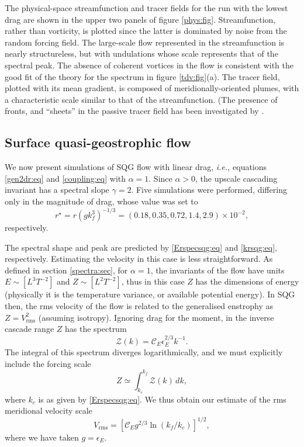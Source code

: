 \documentclass{jfm}
\newcommand{\ie}  {\textit{i.e., }}
\newcommand{\ca}  [1]{\mathcal{#1}}
\newcommand{\rms} {\mathrm{rms}}
\begin{document}
The physical-space streamfunction and tracer fields for the run with
the lowest drag are shown in the upper two panels of figure
\ref{phys:fig}. Streamfunction, rather than vorticity, is plotted
since the latter is dominated by noise from the random forcing field.
The large-scale flow represented in the streamfunction is nearly
structureless, but with undulations whose scale represents that of the
spectral peak. The absence of coherent vortices in the flow is
consistent with the good fit of the theory for the spectrum in figure
\ref{tdv:fig}(a).  The tracer field, plotted with its mean gradient,
is composed of meridionally-oriented plumes, with a characteristic
scale similar to that of the streamfunction.  (The presence of fronts,
and ``sheets'' in the passive tracer field has been investigated by
\citet{constantin94}. %

\subsection{Surface quasi-geostrophic flow}
\label{sqg_exp:ssc}

We now present simulations of SQG flow with linear drag, \ie equations
\eqref{gen2dr:eq} and \eqref{coupling:eq} with $\alpha=1$.  Since
$\alpha>0$, the upscale cascading invariant has a spectral slope
$\gamma=2$.  Five simulations were performed, differing only in the
magnitude of drag, whose value was set to
\[
r^{\star} = r\left(gk_f^3\right)^{-1/3}
=(0.18,0.35,0.72,1.4,2.9)\times 10^{-2},
\]
respectively.

The spectral shape and peak are predicted by \eqref{Erspecsqg:eq} and
\eqref{krsqg:eq}, respectively.  Estimating the velocity in this case
is less straightforward.  As defined in section \ref{spectra:sec}, for
$\alpha=1$, the invariants of the flow have units $E\sim[L^3T^{-2}]$
and $Z\sim[L^2T^{-2}]$, thus in this case $Z$ has the dimensions of
energy (physically it is the temperature variance, or available
potential energy).  In SQG then, the rms velocity of the flow is
related to the generalised enstrophy as $Z=V_{\rms}^2$ (assuming
isotropy).  Ignoring drag for the moment, in the inverse cascade range
$Z$ has the spectrum
\begin{equation}
\ca{Z}(k) = \ca{C}_E\epsilon_E^{2/3}k^{-1}.
\label{Zsqg:eq}
\end{equation}
The integral of this spectrum diverges logarithmically, and we must
explicitly include the forcing scale
\begin{equation}
Z \simeq \int_{k_c}^{k_f}\ca{Z}(k)\, dk,
\label{Zsqg2:eq}
\end{equation}
where $k_c$ is as given by \eqref{Erspecsqg:eq}.  We thus obtain our
estimate of the rms meridional velocity scale
\begin{equation}
V_{\rms} = \left[\ca{C}_Eg^{2/3}\ln\left(k_f/k_c\right)\right]^{1/2},
\label{Vsqg:eq}
\end{equation}
where we have taken $g=\epsilon_E$.
\end{document}
